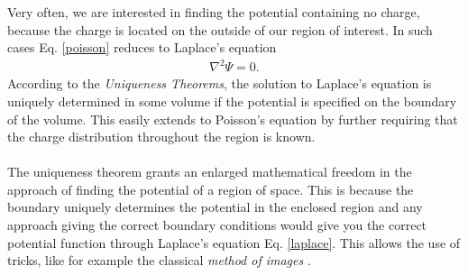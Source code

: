 Very often, we are interested in finding the potential containing no charge, because the charge is 
located on the outside of our region of interest. In such cases Eq. \eqref{poisson} reduces to
Laplace's equation \cite[p.~110-111]{Griffiths} 
\begin{align}
   \label{laplace}
   \nabla^2 \Psi = 0.
\end{align}
According to the \textit{Uniqueness Theorems}, the solution to Laplace's equation is uniquely 
determined in some volume if the potential is specified on the boundary of the volume. This
easily extends to Poisson's equation by further requiring that the charge distribution throughout 
the region is known.
\\
\\
The uniqueness theorem grants an enlarged mathematical freedom in the approach of finding the potential
of a region of space. This is because the boundary uniquely determines the potential in the enclosed
region and any approach giving the correct boundary conditions would give you the correct potential 
function through Laplace's equation Eq. \eqref{laplace}. This allows the use of tricks, like for example
the classical \textit{method of images} \cite[p.~116-121]{Griffiths}.

